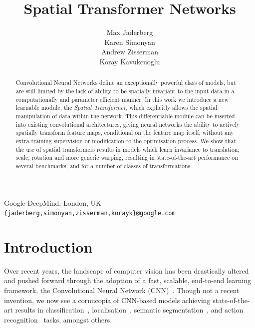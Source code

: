 \documentclass{article} %
\begin{document}
\title{Spatial Transformer Networks}
\author{
Max Jaderberg \\
\And
Karen Simonyan \\
\And
Andrew Zisserman \\
\And
Koray Kavukcuoglu
}
\maketitle
 \vspace{-3.0em}
 \begin{center}
 Google DeepMind, London, UK\\
 \texttt{\{jaderberg,simonyan,zisserman,korayk\}@google.com}
 \end{center}
 \vspace{1em}
\begin{abstract}
Convolutional Neural Networks define an exceptionally
powerful class of models, but are still limited by the lack of ability
to be spatially invariant to the input data in a computationally and parameter
efficient manner. In this work we introduce a new learnable module, the
\emph{Spatial Transformer}, which explicitly allows the spatial manipulation of
data within the network. This differentiable module can be inserted
into existing convolutional architectures, giving neural networks the ability to
actively spatially transform feature maps, conditional on the feature map itself,
without any extra training supervision or modification to the optimisation process. We show that the use
of spatial transformers results in models which learn invariance to translation,
scale, rotation and more generic warping, resulting in state-of-the-art
performance on several benchmarks, and for a number
of classes of transformations.
\end{abstract}

\section{Introduction}

Over recent years, the landscape of computer vision has been
drastically altered and pushed forward through the adoption of a fast,
scalable, end-to-end learning framework, the Convolutional Neural
Network (CNN)~\cite{Lecun98}. Though not a recent invention, we now
see a cornucopia of CNN-based models achieving state-of-the-art results
in classification~\cite{Szegedy14,Jaderberg14c,Schroff15},
localisation~\cite{Simonyan14c,Tompson14}, semantic
segmentation~\cite{Long15}, and action
recognition~\cite{Simonyan14video,Gkioxari15} tasks, amongst others.
\end{document}
